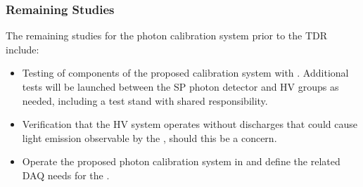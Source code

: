  

\subsubsection{Remaining Studies}
The remaining studies %
for the photon calibration system prior to the TDR include:
\begin{itemize}
\item Testing of components of the proposed  calibration system with . Additional tests will be launched between the SP photon detector and HV groups as needed, including a test stand with shared responsibility. 
\item %
Verification that the HV system operates without discharges that could cause light emission observable by the , should this be a concern.
\item Operate the proposed photon calibration system in  %
and define the related DAQ needs for the \fardet.
\end{itemize}

